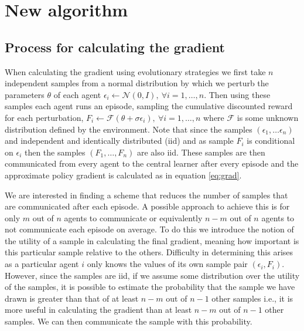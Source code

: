 \section{New algorithm}
\subsection{Process for calculating the gradient}
When calculating the gradient using evolutionary strategies we first take $n$ independent samples from a normal distribution by which we perturb the parameters $\theta$ of each agent $\epsilon_i \leftarrow \mathcal{N}(0,I), \ \forall i=1,\dots,n$. Then using these samples each agent runs an episode, sampling the cumulative discounted reward for each perturbation, $F_i \leftarrow \mathcal{F}(\theta+\sigma \epsilon_i), \ \forall i=1,\dots,n$ where $\mathcal{F}$ is some unknown distribution defined by the environment. Note that since the samples $(\epsilon_1,\dots\epsilon_n)$ and independent and identically distributed (iid) and as sample $F_i$ is conditional on $\epsilon_i$ then the samples $(F_1,\dots,F_n)$ are also iid. These samples are then communicated from every agent to the central learner after every episode and the approximate policy gradient is calculated as in equation \ref{eq:grad}.

We are interested in finding a scheme that reduces the number of samples that are communicated after each episode. A possible approach to achieve this is for only $m$ out of $n$ agents to communicate or equivalently $n-m$ out of $n$ agents to not communicate each episode on average. To do this we introduce the notion of the utility of a sample in calculating the final gradient, meaning how important is this particular sample relative to the others. Difficulty in determining this arises as a particular agent $i$ only knows the values of its own sample pair $(\epsilon_i, F_i)$. However, since the samples are iid, if we assume some distribution over the utility of the samples, it is possible to estimate the probability that the sample we have drawn is greater than that of at least $n-m$ out of $n-1$ other samples i.e., it is more useful in calculating the gradient than at least $n-m$ out of $n-1$ other samples. We can then communicate the sample with this probability.

